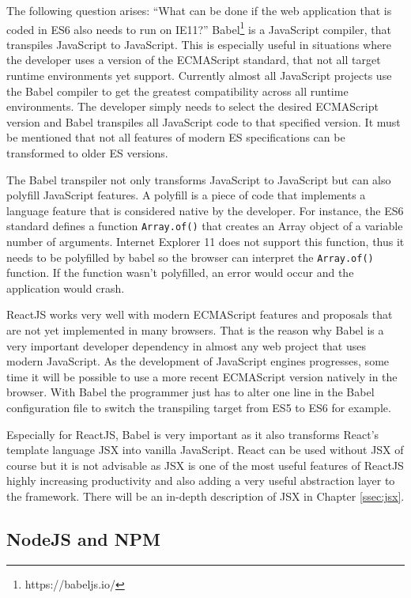 The following question arises: \enquote{What can be done if the web application that is coded in ES6 also needs to run on IE11?} \mbox{Babel}\footnote{https://babeljs.io/} is a JavaScript compiler, that transpiles JavaScript to JavaScript. This is especially useful in situations where the developer uses a version of the ECMAScript standard, that not all target runtime environments yet support. Currently almost all JavaScript projects use the \mbox{Babel} compiler to get the greatest compatibility across all runtime environments. The developer simply needs to select the desired ECMAScript version and \mbox{Babel} transpiles all JavaScript code to that specified version. It must be mentioned that not all features of modern ES specifications can be transformed to older ES versions.

The \mbox{Babel} transpiler not only transforms JavaScript to JavaScript but can also polyfill JavaScript features. A polyfill is a piece of code that implements a language feature that is considered native by the developer. For instance, the ES6 standard defines a function \texttt{Array.of()} that creates an Array object of a variable number of arguments. Internet Explorer 11 does not support this function, thus it needs to be polyfilled by babel so the browser can interpret the \texttt{Array.of()} function. If the function wasn't polyfilled, an error would occur and the application would crash. 

\mbox{ReactJS} works very well with modern ECMAScript features and proposals that are not yet implemented in many browsers. That is the reason why \mbox{Babel} is a very important developer dependency in almost any web project that uses modern JavaScript. As the development of JavaScript engines progresses, some time it will be possible to use a more recent ECMAScript version natively in the browser. With Babel the programmer just has to alter one line in the \mbox{Babel} configuration file to switch the transpiling target from ES5 to ES6 for example.

Especially for ReactJS, Babel is very important as it also transforms React's template language JSX into vanilla JavaScript. React can be used without JSX of course but it is not advisable as JSX is one of the most useful features of ReactJS highly increasing productivity and also adding a very useful abstraction layer to the framework. There will be an in-depth description of JSX in Chapter \ref{ssec:jsx}.

\subsection{NodeJS and NPM}

